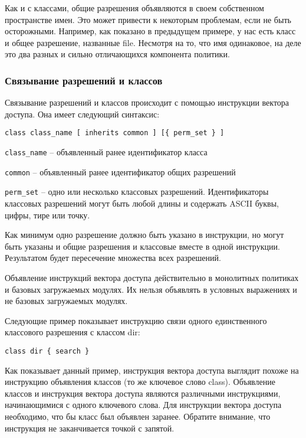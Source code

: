 \documentclass{./../class/UIR}
\begin{document}
    Как и с классами, общие разрешения объявляются в своем собственном пространстве
    имен. Это может привести к некоторым проблемам, если не быть осторожными.
    Например, как показано в предыдущем примере, у нас есть класс и общее
    разрешение, названные file. Несмотря на то, что имя одинаковое, на деле это два
    разных и сильно отличающихся компонента политики.

\subsubsection{Связывание разрешений и классов}
    Связывание разрешений и классов происходит с помощью инструкции вектора
    доступа. Она имеет следующий синтаксис:
	
\begin{verbatim}
class class_name [ inherits common ] [{ perm_set } ]
\end{verbatim}
	
	\verb"class_name" – объявленный ранее идентификатор класса
	
	\verb"common" – объявленный ранее идентификатор общих разрешений
	
	\verb"perm_set" – одно или несколько классовых разрешений. Идентификаторы
	классовых разрешений могут быть любой длины и содержать ASCII буквы, цифры, тире или точку.

    Как минимум одно разрешение должно быть указано в инструкции, но могут быть
    указаны и общие разрешения и классовые вместе в одной инструкции. Результатом
    будет пересечение множества всех разрешений.

    Объявление инструкций вектора доступа действительно в монолитных политиках и
    базовых загружаемых модулях. Их нельзя объявлять в условных выражениях и не
    базовых загружаемых модулях.

    Следующие пример показывает инструкцию связи одного единственного классового
    разрешения с классом dir:
\begin{verbatim}
class dir { search }
\end{verbatim}
    Как показывает данный пример, инструкция вектора доступа выглядит похоже на
    инструкцию объявления классов (то же ключевое слово class). Объявление классов и
    инструкция вектора доступа являются различными инструкциями, начинающимися с
    одного ключевого слова. Для инструкции вектора доступа необходимо, что бы класс
    был объявлен заранее. Обратите внимание, что инструкция не заканчивается точкой
    с запятой.
\end{document}
